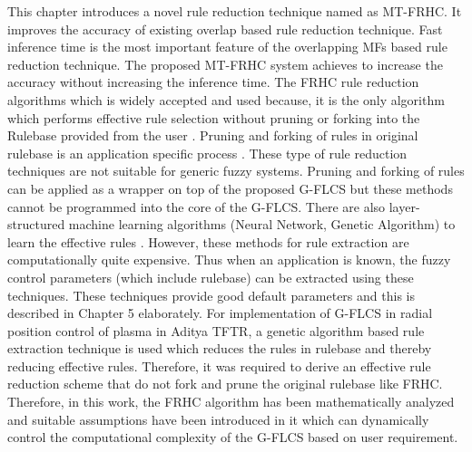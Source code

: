 This chapter introduces a novel rule reduction technique named as MT-FRHC. It improves the accuracy of existing overlap based rule reduction technique. Fast inference time is the most important feature of the overlapping MFs based rule reduction technique. The proposed MT-FRHC system achieves to increase the accuracy without increasing the inference time. The FRHC rule reduction algorithms which is widely accepted and used because, it is the only algorithm which performs effective rule selection without pruning or forking into the Rulebase provided from the user \cite{Razib2013,Munoz-Salinas2008,Alcala2006,Sanz2011}. Pruning and forking of rules in original rulebase is an application specific process \cite{Nguyen2015,Wang1992a,Setnes1998}. These type of rule reduction techniques are not suitable for generic fuzzy systems. Pruning and forking of rules can be applied as a wrapper on top of the proposed G-FLCS but these methods cannot be programmed into the core of the G-FLCS. There are also layer-structured machine learning algorithms (Neural Network, Genetic Algorithm) to learn the effective rules \cite{Shann1995,Ishibuchi1995,Ishibuchi1995a}. However, these methods for rule extraction are computationally quite expensive. Thus when an application is known, the fuzzy control parameters (which include rulebase) can be extracted using these techniques. These techniques provide good default parameters and this is described in Chapter 5 elaborately. For implementation of G-FLCS in radial position control of plasma in Aditya TFTR, a genetic algorithm based rule extraction technique is used which reduces the rules in rulebase and thereby reducing effective rules. Therefore, it was required to derive an effective rule reduction scheme that do not fork and prune the original rulebase like FRHC. Therefore, in this work, the FRHC algorithm has been mathematically analyzed and suitable assumptions have been introduced in it which can dynamically control the computational complexity of the G-FLCS based on user requirement. 

